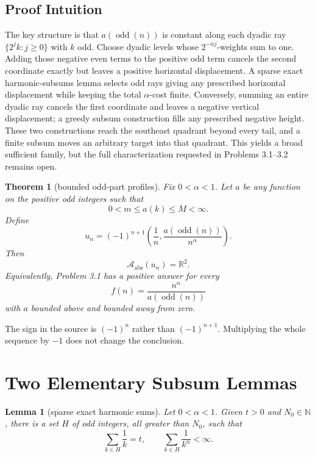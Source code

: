 \documentclass[11pt]{article}
\newtheorem{theorem}{Theorem}
\newtheorem{lemma}{Lemma}
\newcommand{\R}{\mathbb R}
\newcommand{\N}{\mathbb N}
\newcommand{\Aabs}{\mathcal A_{\mathrm{abs}}}
\newcommand{\odd}{\operatorname{odd}}
\begin{document}
\subsection*{Proof Intuition}

The key structure is that $a(\odd(n))$ is constant along each dyadic ray
$\{2^j k:j\geq0\}$ with $k$ odd.  Choose dyadic levels whose
$2^{-\alpha j}$-weights sum to one.  Adding those negative even terms to the
positive odd term cancels the second coordinate exactly but leaves a positive
horizontal displacement.  A sparse exact harmonic-subsums lemma selects odd
rays giving any prescribed horizontal displacement while keeping the total
$\alpha$-cost finite.  Conversely, summing an entire dyadic ray cancels the
first coordinate and leaves a negative vertical displacement; a greedy
subsum construction fills any prescribed negative height.  These two
constructions reach the southeast quadrant beyond every tail, and a finite
subsum moves an arbitrary target into that quadrant.  This yields a broad
sufficient family, but the full characterization requested in Problems
3.1--3.2 remains open.

\begin{theorem}[bounded odd-part profiles]\label{thm:profile}
Fix $0<\alpha<1$.  Let $a$ be any function on the positive odd integers
such that
\[
  0<m\leq a(k)\leq M<\infty.
\]
Define
\[
 u_n=(-1)^{n+1}\left(\frac1n,
       \frac{a(\odd(n))}{n^\alpha}\right).
\]
Then
\[
  \Aabs(u_n)=\R^2.
\]
Equivalently, Problem 3.1 has a positive answer for every
\[
  f(n)=\frac{n^\alpha}{a(\odd(n))}
\]
with $a$ bounded above and bounded away from zero.
\end{theorem}

The sign in the source is $(-1)^n$ rather than $(-1)^{n+1}$.  Multiplying
the whole sequence by $-1$ does not change the conclusion.

\section*{Two Elementary Subsum Lemmas}

\begin{lemma}[sparse exact harmonic sums]\label{lem:harmonic}
Let $0<\alpha<1$.  Given $t>0$ and $N_0\in\N$, there is a set $H$ of
odd integers, all greater than $N_0$, such that
\[
  \sum_{k\in H}\frac1k=t,
  \qquad
  \sum_{k\in H}\frac1{k^\alpha}<\infty.
\]
\end{lemma}
\end{document}
